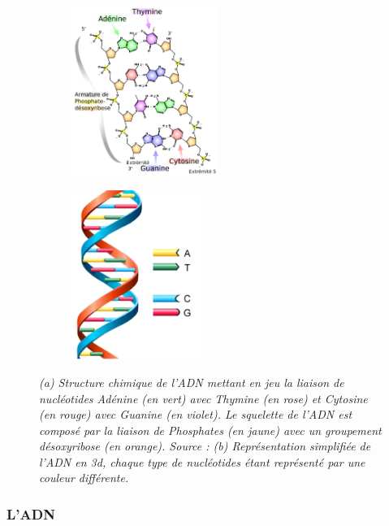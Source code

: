 \begin{figure}
  \begin{subfigure}{.6\textwidth}
  \centering
  {\includegraphics[height=5.5cm]{./figures/ch1/dna_structure}}
    \caption{}
    \label{Fig:dna_structure}
  \end{subfigure}
  \begin{subfigure}{.4\textwidth}
  \centering
  {\includegraphics[height=5.5cm]{./figures/ch1/dna_structure_3d}}
    \caption{}
    \label{Fig:dna_structure_3d}
  \end{subfigure}
  \caption[(a) Structure ADN 2d / (b) Structure ADN 3d]{\it (a) Structure chimique de l'ADN mettant en jeu la liaison de nucléotides Adénine (en vert) avec Thymine (en rose) et Cytosine (en rouge) avec Guanine (en violet). Le squelette de l'ADN est composé par la liaison de Phosphates (en jaune) avec un groupement désoxyribose (en orange). Source : \cite{en:user:madprime_dna_chemical_structure_fr_2007}
  (b) Représentation simplifiée de l'ADN en 3d, chaque type de nucléotides étant représenté par une couleur différente.}
\end{figure}

\subsubsection{L'ADN}

